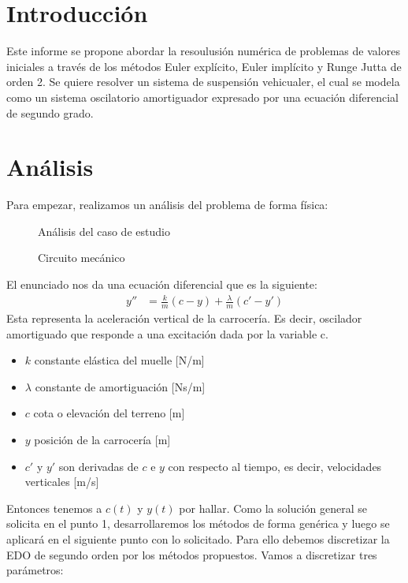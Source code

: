 \documentclass[12pt]{article}
\numberwithin{equation}{section}
\numberwithin{figure}{section}
\numberwithin{table}{section}
\begin{document}
%
%
\setcounter{page}{1}

%
%
\tableofcontents
\newpage

%
%
\section{Introducción}
Este informe se propone abordar la resoulusión numérica de problemas de valores iniciales a través de los métodos Euler explícito, Euler implícito y Runge Jutta de orden 2. Se quiere resolver un sistema de suspensión vehicualer, el cual se modela como un sistema oscilatorio amortiguador expresado por una ecuación diferencial de segundo grado.
\section{Análisis}
Para empezar, realizamos un análisis del problema de forma física:
\begin{figure}[h] 
    \centering
    
    \caption{Análisis del caso de estudio}
    \label{fig:mi_figura}
\end{figure}

\begin{figure}[h] 
    \centering
    
    \caption{Circuito mecánico}
    \label{fig:mi_figura}
\end{figure}
El enunciado nos da una ecuación diferencial que es la siguiente:
\begin{align}
    y'' &= \frac{k}{m}(c - y) + \frac{\lambda}{m}(c' - y')
\end{align}
Esta representa la aceleración vertical de la carrocería. Es decir, oscilador amortiguado que responde a una excitación dada por la variable c.
\begin{itemize}
    \item \( k \) constante elástica del muelle [N/m]
    \item \( \lambda \) constante de amortiguación [Ns/m]
    \item \( c \) cota o elevación del terreno [m]
    \item \( y \) posición de la carrocería [m]
    \item \( c' \) y \( y' \) son derivadas de \( c \) e \( y \) con respecto al tiempo, es decir, velocidades verticales [m/s]
\end{itemize}
Entonces tenemos a \(c(t)\) y \(y(t)\) por hallar.
Como la solución general se solicita en el punto 1, desarrollaremos los métodos de forma genérica y luego se aplicará en el siguiente punto con lo solicitado.
Para ello debemos discretizar la EDO de segundo orden por los métodos propuestos.
Vamos a discretizar tres parámetros:
\end{document}
